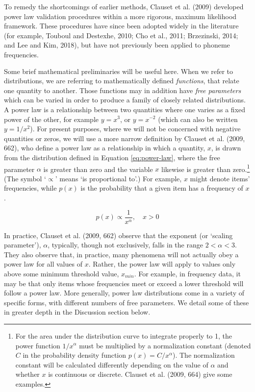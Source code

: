 To remedy the shortcomings of earlier methods, Clauset et al. (2009) developed power law validation procedures within a more rigorous, maximum likelihood framework. These procedures have since been adopted widely in the literature (for example, Touboul and Destexhe, 2010; Cho et al., 2011; Brzezinski, 2014; and Lee and Kim, 2018), but have not previously been applied to phoneme frequencies.

Some brief mathematical preliminaries will be useful here. When we refer to distributions, we are referring to mathematically defined \emph{functions}, that relate one quantity to another. Those functions may in addition have \emph{free parameters} which can be varied in order to produce a family of closely related distributions. A power law is a relationship between two quantities where one varies as a fixed power of the other, for example \(y = x^3\), or \(y = x^{-2}\) (which can also be written \(y = 1/x^2\)). For present purposes, where we will not be concerned with negative quantities or zeros, we will use a more narrow definition by Clauset et al. (2009, 662), who define a power law as a relationship in which a quantity, \(x\), is drawn from the distribution defined in Equation \eqref{eq:power-law}, where the free parameter \(\alpha\) is greater than zero and the variable \(x\) likewise is greater than zero.\footnote{For the area under the distribution curve to integrate properly to 1, the power function \(1/x^{\alpha}\) must be multiplied by a normalization constant (denoted \(C\) in the probability density function \(p(x) = C/x^{\alpha}\)). The normalization constant will be calculated differently depending on the value of \(\alpha\) and whether \(x\) is continuous or discrete. Clauset et al. (2009, 664) give some examples.} (The symbol `\(\propto\)' means `is proportional to'.) For example, \(x\) might denote items' frequencies, while \(p(x)\) is the probability that a given item has a frequency of \(x\).

\begin{equation}
p(x) \propto \frac{1}{x^{\alpha}},\quad x > 0
\label{eq:power-law}
\end{equation}

In practice, Clauset et al. (2009, 662) observe that the exponent (or `scaling parameter'), \(\alpha\), typically, though not exclusively, falls in the range \(2 < \alpha < 3\). They also observe that, in practice, many phenomena will not actually obey a power law for all values of \(x\). Rather, the power law will apply to values only above some minimum threshold value, \(x_{min}\). For example, in frequency data, it may be that only items whose frequencies meet or exceed a lower threshold will follow a power law. More generally, power law distributions come in a variety of specific forms, with different numbers of free parameters. We detail some of these in greater depth in the Discussion section below.


